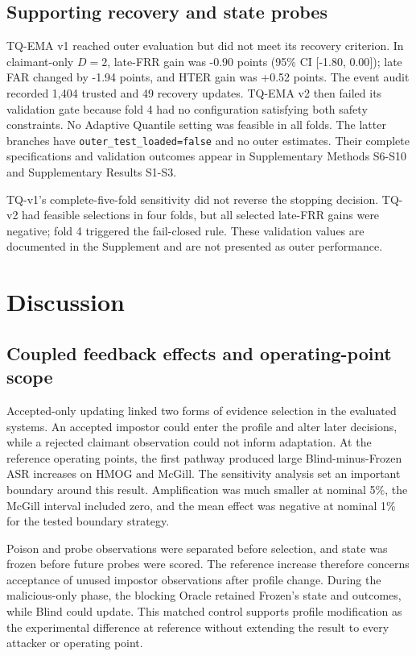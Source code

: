 \documentclass[technologies,article,submit,moreauthors]{Definitions/mdpi}
\begin{document}
\subsection{Supporting recovery and state probes}\label{sec:supporting-recovery-and-state-probes}

TQ-EMA v1 reached outer evaluation but did not meet its recovery criterion. In claimant-only \(D=2\), late-FRR gain was -0.90 points (95\% CI {[}-1.80, 0.00{]}); late FAR changed by -1.94 points, and HTER gain was +0.52 points. The event audit recorded 1,404 trusted and 49 recovery updates. TQ-EMA v2 then failed its validation gate because fold 4 had no configuration satisfying both safety constraints. No Adaptive Quantile setting was feasible in all folds. The latter branches have \texttt{outer\_test\_loaded=false} and no outer estimates. Their complete specifications and validation outcomes appear in Supplementary Methods S6-S10 and Supplementary Results S1-S3.

TQ-v1's complete-five-fold sensitivity did not reverse the stopping decision. TQ-v2 had feasible selections in four folds, but all selected late-FRR gains were negative; fold 4 triggered the fail-closed rule. These validation values are documented in the Supplement and are not presented as outer performance.

\section{Discussion}\label{sec:discussion}

\subsection{Coupled feedback effects and operating-point scope}\label{sec:coupled-feedback-effects-and-operating-point-scope}

Accepted-only updating linked two forms of evidence selection in the evaluated systems. An accepted impostor could enter the profile and alter later decisions, while a rejected claimant observation could not inform adaptation. At the reference operating points, the first pathway produced large Blind-minus-Frozen ASR increases on HMOG and McGill. The sensitivity analysis set an important boundary around this result. Amplification was much smaller at nominal 5\%, the McGill interval included zero, and the mean effect was negative at nominal 1\% for the tested boundary strategy.

Poison and probe observations were separated before selection, and state was frozen before future probes were scored. The reference increase therefore concerns acceptance of unused impostor observations after profile change. During the malicious-only phase, the blocking Oracle retained Frozen's state and outcomes, while Blind could update. This matched control supports profile modification as the experimental difference at reference without extending the result to every attacker or operating point.
\end{document}
